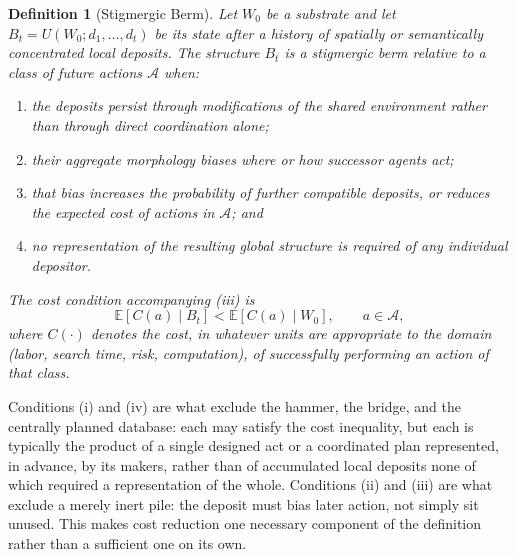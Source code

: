 \documentclass[11pt]{article}
\newtheorem{definition}{Definition}
\begin{document}
\begin{definition}[Stigmergic Berm]
Let $W_0$ be a substrate and let $B_t = U(W_0; d_1, \ldots, d_t)$ be its state after a history of spatially or semantically concentrated local deposits. The structure $B_t$ is a \emph{stigmergic berm} relative to a class of future actions $\mathcal{A}$ when:
\begin{enumerate}[label=(\roman*)]
\item the deposits persist through modifications of the shared environment rather than through direct coordination alone;
\item their aggregate morphology biases where or how successor agents act;
\item that bias increases the probability of further compatible deposits, or reduces the expected cost of actions in $\mathcal{A}$; and
\item no representation of the resulting global structure is required of any individual depositor.
\end{enumerate}
The cost condition accompanying (iii) is
\[
\mathbb{E}\left[C(a) \mid B_t\right]
<
\mathbb{E}\left[C(a) \mid W_0\right],
\qquad a \in \mathcal{A},
\]
where $C(\cdot)$ denotes the cost, in whatever units are appropriate to the domain (labor, search time, risk, computation), of successfully performing an action of that class.
\end{definition}

Conditions (i) and (iv) are what exclude the hammer, the bridge, and the centrally planned database: each may satisfy the cost inequality, but each is typically the product of a single designed act or a coordinated plan represented, in advance, by its makers, rather than of accumulated local deposits none of which required a representation of the whole. Conditions (ii) and (iii) are what exclude a merely inert pile: the deposit must bias later action, not simply sit unused. This makes cost reduction one necessary component of the definition rather than a sufficient one on its own.
\end{document}
